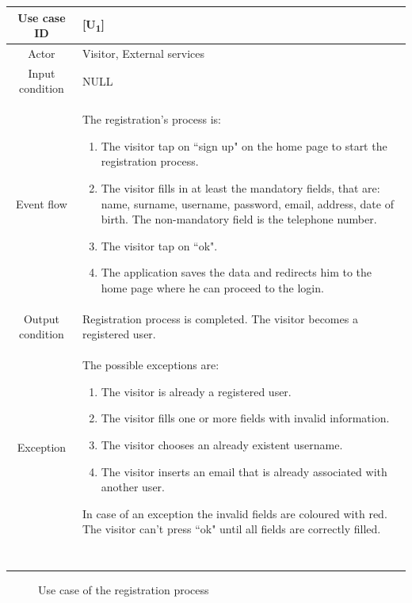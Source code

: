 \documentclass[12pt,titlepage]{article}
\begin{document}
\begin{tabular}{cp{10cm}} 
Use case ID& {[U\textsubscript{1}]}\\ \hline
Actor&Visitor, External services\\ \hline 

Input condition&NULL \\ \hline
Event flow&The registration's process is: \begin{enumerate}
\item The visitor tap on ``sign up" on the home page to start the registration process.
\item The visitor fills in at least the mandatory fields, that are: name, surname, username, password, email, address, date of birth. The non-mandatory field is the telephone number.
\item The visitor tap on ``ok".
\item The application saves the data and redirects him to the home page where he can proceed to the login.
\end{enumerate} \\ \hline
Output condition&Registration process is completed. The visitor becomes a registered user. \\ \hline
Exception& The possible exceptions are:
\begin{enumerate}
\item The visitor is already a registered user.
\item The visitor fills one or more fields with invalid information.
\item The visitor chooses an already existent username.
\item The visitor inserts an email that is already associated with another user.
\end{enumerate} 
In case of an exception the invalid fields are coloured with red. The visitor can't press ``ok" until all fields are correctly filled.\\ \hline \

\end{tabular}

\pagebreak

\begin{figure}
\centering
{}
\caption{Use case of the registration process}

\end{figure}
\end{document}
